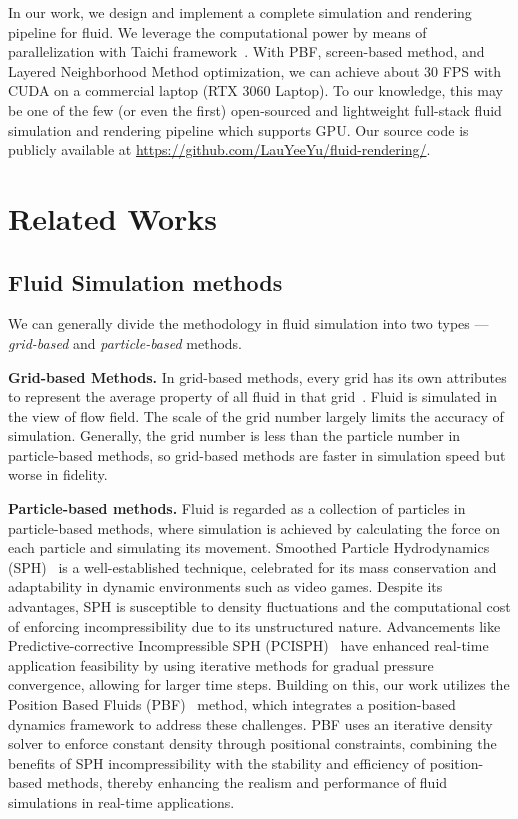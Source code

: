 \documentclass[sigconf]{acmart}
\begin{document}
In our work, we design and implement a complete simulation and rendering pipeline for fluid. We leverage the computational power by means of parallelization with Taichi framework~\cite{hu2019taichi, hu2019difftaichi, hu2021quantaichi}. With PBF, screen-based method, and Layered Neighborhood Method optimization, we can achieve about 30 FPS with CUDA on a commercial laptop (RTX 3060 Laptop). To our knowledge, this may be one of the few (or even the first) open-sourced and lightweight full-stack fluid simulation and rendering pipeline which supports GPU. Our source code is publicly available at \url{https://github.com/LauYeeYu/fluid-rendering/}.

\section{Related Works}
\subsection{Fluid Simulation methods}
We can generally divide the methodology in fluid simulation into two types --- \textit{grid-based} and \textit{particle-based} methods.

\textbf{Grid-based Methods.} In grid-based methods, every grid has its own attributes to represent the average property of all fluid in that grid~\cite{harlow1965numerical, foster2001practical}. Fluid is simulated in the view of flow field. The scale of the grid number largely limits the accuracy of simulation. Generally, the grid number is less than the particle number in particle-based methods, so grid-based methods are faster in simulation speed but worse in fidelity.

\textbf{Particle-based methods.} Fluid is regarded as a collection of particles in particle-based methods, where simulation is achieved by calculating the force on each particle and simulating its movement. Smoothed Particle Hydrodynamics (SPH)~\cite{monaghan1992smoothed} is a well-established technique, celebrated for its mass conservation and adaptability in dynamic environments such as video games. Despite its advantages, SPH is susceptible to density fluctuations and the computational cost of enforcing incompressibility due to its unstructured nature. Advancements like Predictive-corrective Incompressible SPH (PCISPH)~\cite{solenthaler2009predictive} have enhanced real-time application feasibility by using iterative methods for gradual pressure convergence, allowing for larger time steps. Building on this, our work utilizes the Position Based Fluids (PBF)~\cite{macklin2013position} method, which integrates a position-based dynamics framework to address these challenges. PBF uses an iterative density solver to enforce constant density through positional constraints, combining the benefits of SPH incompressibility with the stability and efficiency of position-based methods, thereby enhancing the realism and performance of fluid simulations in real-time applications.
\end{document}
